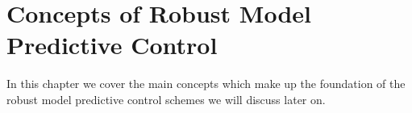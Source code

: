 
\chapter{Concepts of Robust Model Predictive Control}\label{chap:concepts}
In this chapter we cover the main concepts which make up the foundation of
the robust model predictive control schemes we will discuss later on.
%
\begin{defn}
\end{defn}